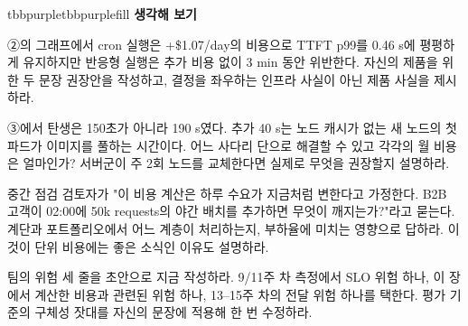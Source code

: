 \begin{calloutbox}{tbbpurple}{tbbpurplefill}
{\normalsize\bfseries\color{tbbpurple}생각해 보기}\par\vspace{3pt}
\begin{tbbitemize}
  \item ②의 그래프에서 cron 실행은 +\$1.07/day의 비용으로 TTFT p99를 0.46 s에 평평하게 유지하지만 반응형 실행은 추가 비용 없이 3 min 동안 위반한다. 자신의 제품을 위한 두 문장 권장안을 작성하고, 결정을 좌우하는 인프라 사실이 아닌 제품 사실을 제시하라.
  \item ③에서 탄생은 150초가 아니라 190 s였다. 추가 40 s는 노드 캐시가 없는 새 노드의 첫 파드가 이미지를 풀하는 시간이다. 어느 사다리 단으로 해결할 수 있고 각각의 월 비용은 얼마인가? 서버군이 주 2회 노드를 교체한다면 실제로 무엇을 권장할지 설명하라.
  \item 중간 점검 검토자가 "이 비용 계산은 하루 수요가 지금처럼 변한다고 가정한다. B2B 고객이 02:00에 50k requests의 야간 배치를 추가하면 무엇이 깨지는가?"라고 묻는다. 계단과 포트폴리오에서 어느 계층이 처리하는지, 부하율에 미치는 영향으로 답하라. 이것이 단위 비용에는 좋은 소식인 이유도 설명하라.
  \item 팀의 위험 세 줄을 초안으로 지금 작성하라. 9/11주 차 측정에서 SLO 위험 하나, 이 장에서 계산한 비용과 관련된 위험 하나, 13–15주 차의 전달 위험 하나를 택한다. 평가 기준의 구체성 잣대를 자신의 문장에 적용해 한 번 수정하라.
\end{tbbitemize}
\end{calloutbox}





